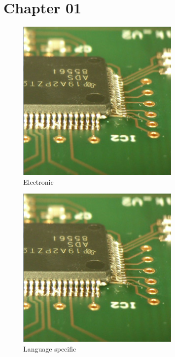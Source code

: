 \chapter{Chapter 01}

\begin{figure}[h!]
    \begin{center}
        \includegraphics[width=0.2\linewidth]{../common/chapter_01/resources/Elektronik.jpg}
    \end{center}
    \caption{Electronic}
    \label{fig:Electronic}
\end{figure}

\begin{figure}[h!]
    \begin{center}
        \includegraphics[width=0.2\linewidth]{./chapter_01/resources/Language_specific_resource.jpg}
    \end{center}
    \caption{Language specific}
    \label{fig:Language specific}
\end{figure}